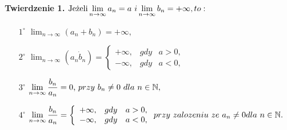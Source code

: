 \documentclass[a4paper,12pt]{article}
\begin{document}
\textbf{Twierdzenie 1.} $\textnormal{Jeżeli} \displaystyle \lim_{n \to \infty} a_n = a \textnormal{ $i$} \lim_{n\to\infty}b_n = +\infty, to:$

\begin{itemize}
\item[$1^{\circ}$] $\displaystyle \lim_{n\to\infty}(a_n + b_n) = +\infty,$


\item[$2^{\circ}$] $\displaystyle \lim_{n\to\infty}(a_n \dot b_n) = \left\lbrace
	\begin{array}{ccc}
	+\infty, & gdy & a > 0, \\
	-\infty, & gdy & a<0,
	\end{array}\right.$


\item[$3^{\circ}$]$\displaystyle\lim_{n\to\infty} \frac{b_n}{a_n} = 0\textnormal{, $przy$ $b_n$} \neq  0\textnormal{ $dla$ $n$} \in \mathbb{N},$

\item[$4^{\circ}$]$\displaystyle \lim_{n\to\infty} \frac{b_n}{a_n} = \left\lbrace
	\begin{array}{ccc}
	+\infty, & gdy & a > 0, \\
	-\infty, & gdy & a < 0,
	\end{array}\right.
\textnormal{$przy$ $zalozeniu$ $ze$ } a_n \neq 0 \textnormal{$dla$ $n$}  \in \mathbb{N}.$
\end{itemize}
\end{document}
